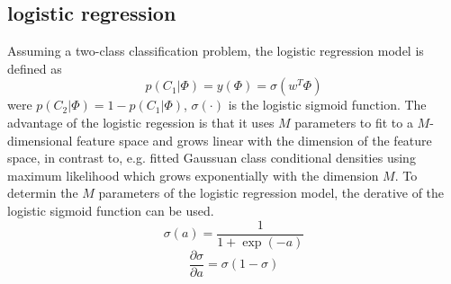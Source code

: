 \subsection{logistic regression}
Assuming a two-class classification problem, the logistic regression model is defined as
\begin{equation} \label{eq:logreg_model}
p(C_1|\Phi) = y(\Phi) = \sigma(w^T\Phi)
\end{equation}
were $p(C_2|\Phi) = 1 - p(C_1|\Phi)$, $\sigma(\cdot)$ is the logistic sigmoid function. The advantage of the logistic regession is that it uses $M$ parameters to fit to a $M$-dimensional feature space and grows linear with the dimension of the feature space, in contrast to, e.g. fitted Gaussuan class conditional densities using maximum likelihood which grows exponentially with the dimension $M$.
To determin the $M$ parameters of the logistic regression model, the derative of the logistic sigmoid function can be used.
\begin{equation} \label{eq:sigmoid}
\sigma(a) = \frac{1}{1 + \exp(-a)}
\end{equation}
\begin{equation} \label{eq:sigmoid_derived}
\frac{\partial\sigma}{\partial a} = \sigma(1-\sigma)
\end{equation}